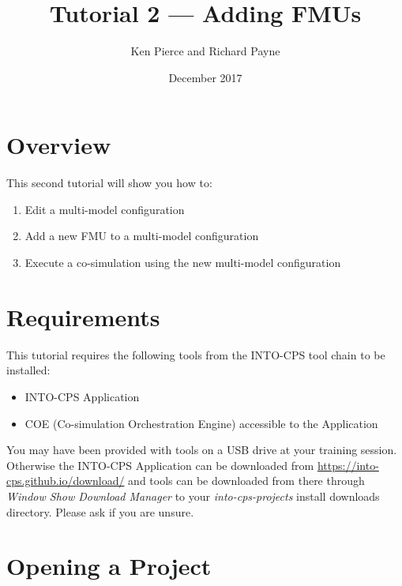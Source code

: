 \documentclass[11pt,a4paper]{../tutorial}
\title{Tutorial 2 --- Adding FMUs}
\date{December 2017}
\author{Ken Pierce and Richard Payne}
\begin{document}
\section*{Overview}

This second tutorial will show you how to:

\begin{enumerate}[noitemsep]
\item Edit a multi-model configuration
\item Add a new FMU to a multi-model configuration
\item Execute a co-simulation using the new multi-model configuration
\end{enumerate}

\section*{Requirements}

This tutorial requires the following tools from the INTO-CPS tool chain to be installed:

\begin{itemize}[noitemsep]
\item INTO-CPS Application
\item COE (Co-simulation Orchestration Engine) accessible to the Application
\end{itemize}

You may have been provided with tools on a USB drive at your training session. Otherwise the INTO-CPS Application can be downloaded from \url{https://into-cps.github.io/download/} and tools can be downloaded from there through \emph{Window \menusep Show Download Manager} to your \emph{into-cps-projects} install downloads directory. Please ask if you are unsure.


\section{Opening a Project}
\end{document}
